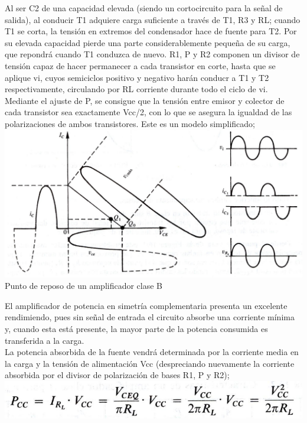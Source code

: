 \documentclass[10pt,a4paper]{article}
\begin{document}
Al ser C2 de una capacidad elevada (siendo un cortocircuito para la señal de salida), al conducir T1 adquiere carga suficiente a través de T1, R3 y RL; cuando T1 se corta, la tensión en extremos del condensador hace de fuente para T2. Por su elevada capacidad pierde una parte considerablemente pequeña de su carga, que repondrá cuando T1 conduzca de nuevo.
R1, P y R2 componen un divisor de tensión capaz de hacer permanecer a cada transistor en corte, hasta que se aplique vi, cuyos semiciclos positivo y negativo harán conducr a T1 y T2 respectivamente, circulando por RL corriente durante todo el ciclo de vi.\\
Mediante el ajuste de P, se consigue que la tensión entre emisor y colector de cada transistor sea exactamente Vcc/2, con lo que se asegura la igualdad de las polarizaciones de ambos transistores. Este es un modelo simplificado;\\
\centering
\includegraphics[scale=.40]{gr.png}\\
\centering
Punto de reposo de un amplificador clase B\\
\raggedright
El amplificador de potencia en simetría complementaria presenta un excelente rendimiendo, pues sin señal de entrada el circuito absorbe una corriente mínima y, cuando esta está presente, la mayor parte de la potencia consumida es transferida a la carga.\\
La potencia absorbida de la fuente vendrá determinada por la corriente media en la carga y la tensión de alimentación Vcc (despreciando nuevamente la corriente absorbida por el divisor de polarización de bases R1, P y R2);\\
\centering
\includegraphics[scale=.50]{for.png}\\
\end{document}
